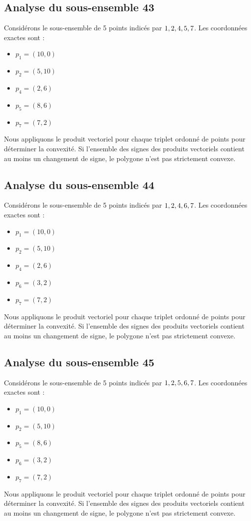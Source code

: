\documentclass[11pt]{article}
\begin{document}
\subsection{Analyse du sous-ensemble 43}
Considérons le sous-ensemble de 5 points indicés par $\\{ 1, 2, 4, 5, 7 \\}$.
Les coordonnées exactes sont :
\begin{itemize}
\item $p_1 = (10, 0)$
\item $p_2 = (5, 10)$
\item $p_4 = (2, 6)$
\item $p_5 = (8, 6)$
\item $p_7 = (7, 2)$
\end{itemize}
Nous appliquons le produit vectoriel pour chaque triplet ordonné de points pour déterminer la convexité. Si l'ensemble des signes des produits vectoriels contient au moins un changement de signe, le polygone n'est pas strictement convexe.
\newpage

\subsection{Analyse du sous-ensemble 44}
Considérons le sous-ensemble de 5 points indicés par $\\{ 1, 2, 4, 6, 7 \\}$.
Les coordonnées exactes sont :
\begin{itemize}
\item $p_1 = (10, 0)$
\item $p_2 = (5, 10)$
\item $p_4 = (2, 6)$
\item $p_6 = (3, 2)$
\item $p_7 = (7, 2)$
\end{itemize}
Nous appliquons le produit vectoriel pour chaque triplet ordonné de points pour déterminer la convexité. Si l'ensemble des signes des produits vectoriels contient au moins un changement de signe, le polygone n'est pas strictement convexe.
\newpage

\subsection{Analyse du sous-ensemble 45}
Considérons le sous-ensemble de 5 points indicés par $\\{ 1, 2, 5, 6, 7 \\}$.
Les coordonnées exactes sont :
\begin{itemize}
\item $p_1 = (10, 0)$
\item $p_2 = (5, 10)$
\item $p_5 = (8, 6)$
\item $p_6 = (3, 2)$
\item $p_7 = (7, 2)$
\end{itemize}
Nous appliquons le produit vectoriel pour chaque triplet ordonné de points pour déterminer la convexité. Si l'ensemble des signes des produits vectoriels contient au moins un changement de signe, le polygone n'est pas strictement convexe.
\newpage
\end{document}
